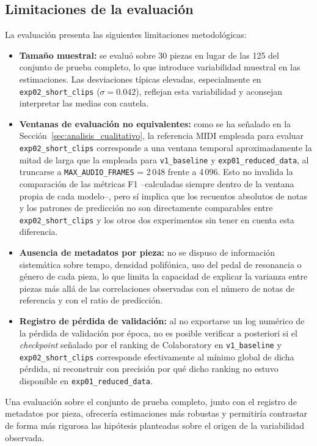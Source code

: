 \subsection{Limitaciones de la evaluación}
\label{sec:limitaciones_evaluacion}

La evaluación presenta las siguientes limitaciones metodológicas:

\begin{itemize}
    \item \textbf{Tamaño muestral:} se evaluó sobre 30 piezas en lugar
    de las 125 del conjunto de prueba completo, lo que introduce
    variabilidad muestral en las estimaciones. Las desviaciones
    típicas elevadas, especialmente en \texttt{exp02\_short\_clips}
    ($\sigma = 0.042$), reflejan esta variabilidad y aconsejan
    interpretar las medias con cautela.
    \item \textbf{Ventanas de evaluación no equivalentes:} como se ha
    señalado en la Sección~\ref{sec:analisis_cualitativo}, la
    referencia MIDI empleada para evaluar \texttt{exp02\_short\_clips}
    corresponde a una ventana temporal aproximadamente la mitad de
    larga que la empleada para \texttt{v1\_baseline} y
    \texttt{exp01\_reduced\_data}, al truncarse a
    \texttt{MAX\_AUDIO\_FRAMES} = 2\,048 frente a 4\,096. Esto no
    invalida la comparación de las métricas F1 --calculadas siempre
    dentro de la ventana propia de cada modelo--, pero sí implica que
    los recuentos absolutos de notas y los patrones de predicción no
    son directamente comparables entre \texttt{exp02\_short\_clips} y
    los otros dos experimentos sin tener en cuenta esta diferencia.
    \item \textbf{Ausencia de metadatos por pieza:} no se dispuso de
    información sistemática sobre tempo, densidad polifónica, uso del
    pedal de resonancia o género de cada pieza, lo que limita la
    capacidad de explicar la varianza entre piezas más allá de las
    correlaciones observadas con el número de notas de referencia y
    con el ratio de predicción.
    \item \textbf{Registro de pérdida de validación:} al no exportarse
    un log numérico de la pérdida de validación por época, no es
    posible verificar a posteriori si el \textit{checkpoint} señalado
    por el ranking de Colaboratory en \texttt{v1\_baseline} y
    \texttt{exp02\_short\_clips} corresponde efectivamente al mínimo
    global de dicha pérdida, ni reconstruir con precisión por qué
    dicho ranking no estuvo disponible en
    \texttt{exp01\_reduced\_data}.
\end{itemize}

Una evaluación sobre el conjunto de prueba completo, junto con el
registro de metadatos por pieza, ofrecería estimaciones más robustas y
permitiría contrastar de forma más rigurosa las hipótesis planteadas
sobre el origen de la variabilidad observada.